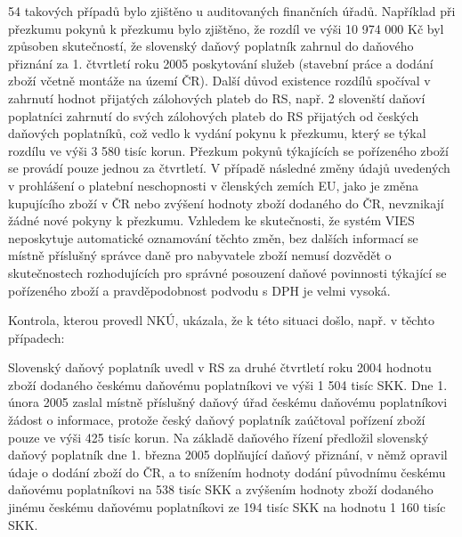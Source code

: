 \documentclass[10pt]{article}
\begin{document}
54 takových případů bylo zjištěno u auditovaných finančních úřadů.
Například při přezkumu pokynů k přezkumu bylo zjištěno, že rozdíl ve výši 10 974 000 Kč byl způsoben skutečností, že slovenský daňový poplatník zahrnul do daňového přiznání za 1. čtvrtletí roku 2005 poskytování služeb (stavební práce a dodání zboží včetně montáže na území ČR).
Další důvod existence rozdílů spočíval v zahrnutí hodnot přijatých zálohových plateb do RS, např. 2 slovenští daňoví poplatníci zahrnutí do svých zálohových plateb do RS přijatých od českých daňových poplatníků, což vedlo k vydání pokynu k přezkumu, který se týkal rozdílu ve výši 3 580 tisíc korun.
Přezkum pokynů týkajících se pořízeného zboží se provádí pouze jednou za čtvrtletí.
V případě následné změny údajů uvedených v prohlášení o platební neschopnosti v členských zemích EU, jako je změna kupujícího zboží v ČR nebo zvýšení hodnoty zboží dodaného do ČR, nevznikají žádné nové pokyny k přezkumu.
Vzhledem ke skutečnosti, že systém VIES neposkytuje automatické oznamování těchto změn, bez dalších informací se místně příslušný správce daně pro nabyvatele zboží nemusí dozvědět o skutečnostech rozhodujících pro správné posouzení daňové povinnosti týkající se pořízeného zboží a pravděpodobnost podvodu s DPH je velmi vysoká.


Kontrola, kterou provedl NKÚ, ukázala, že k této situaci došlo, např. v těchto případech:

Slovenský daňový poplatník uvedl v RS za druhé čtvrtletí roku 2004 hodnotu zboží dodaného českému daňovému poplatníkovi ve výši 1 504 tisíc SKK.
Dne 1. února 2005 zaslal místně příslušný daňový úřad českému daňovému poplatníkovi žádost o informace, protože český daňový poplatník zaúčtoval pořízení zboží pouze ve výši 425 tisíc korun.
Na základě daňového řízení předložil slovenský daňový poplatník dne 1. března 2005 doplňující daňový přiznání, v němž opravil údaje o dodání zboží do ČR, a to snížením hodnoty dodání původnímu českému daňovému poplatníkovi na 538 tisíc SKK a zvýšením hodnoty zboží dodaného jinému českému daňovému poplatníkovi ze 194 tisíc SKK na hodnotu 1 160 tisíc SKK.
\end{document}

